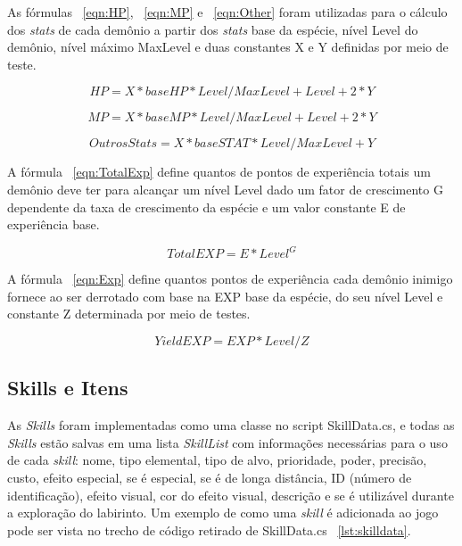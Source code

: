 	As fórmulas ~\ref{eqn:HP}, ~\ref{eqn:MP} e ~\ref{eqn:Other} foram  utilizadas para o cálculo dos \emph{stats} de cada demônio a partir dos \emph{stats} base da espécie, nível Level do demônio, nível máximo MaxLevel e duas constantes X e Y definidas por meio de teste.
	
\begin{equation}
\label{eqn:HP}
HP = X*baseHP * Level/MaxLevel + Level + 2*Y
\end{equation}

\begin{equation}
\label{eqn:MP}
MP = X*baseMP * Level/MaxLevel + Level + 2*Y
\end{equation}

\begin{equation}
\label{eqn:Other}
OutrosStats = X*baseSTAT * Level/MaxLevel + Y
\end{equation}

	A fórmula ~\ref{eqn:TotalExp} define quantos de pontos de experiência totais um demônio deve ter para alcançar um nível Level dado um fator de crescimento G dependente da taxa de crescimento da espécie e um valor constante E de experiência base.
	
\begin{equation}
\label{eqn:TotalExp}
TotalEXP = E * Level^G
\end{equation}

	A fórmula ~\ref{eqn:Exp} define quantos pontos de experiência cada demônio inimigo fornece ao ser derrotado com base na EXP base da espécie, do seu nível Level e constante Z determinada por meio de testes.
	
\begin{equation}
\label{eqn:Exp}
YieldEXP = EXP * Level/Z
\end{equation}


\subsection{Skills e Itens}

	As \emph{Skills} foram implementadas como uma classe no script SkillData.cs, e todas as \emph{Skills} estão salvas em uma lista \emph{SkillList} com informações necessárias para o uso de cada \emph{skill}: nome, tipo elemental, tipo de alvo, prioridade, poder, precisão, custo, efeito especial, se é especial, se é de longa distância, ID (número de identificação),  efeito visual, cor do efeito visual, descrição e se é utilizável durante a exploração do labirinto. Um exemplo de como uma \emph{skill} é adicionada ao jogo pode ser vista no trecho de código retirado de SkillData.cs ~\ref{lst:skilldata}.

